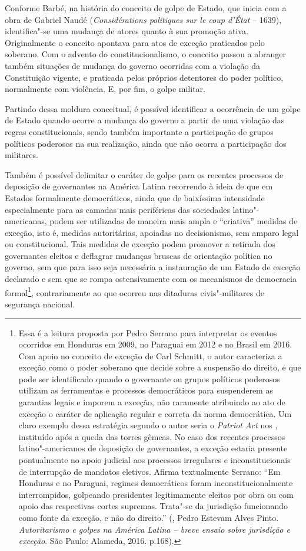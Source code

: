 Conforme Barbé, na história do conceito de golpe de Estado, que inicia
com a obra de Gabriel Naudé (\emph{Considérations politiques sur le coup
d'État} -- 1639), identifica"-se uma mudança de atores quanto à sua
promoção ativa. Originalmente o conceito apontava para atos de exceção
praticados pelo soberano. Com o advento do constitucionalismo, o
conceito passou a abranger também situações de mudança do governo
ocorridas com a violação da Constituição vigente, e praticada pelos
próprios detentores do poder político, normalmente com violência. E, por
fim, o golpe militar.

Partindo dessa moldura conceitual, é possível identificar a ocorrência
de um golpe de Estado quando ocorre a mudança do governo a partir de uma
violação das regras constitucionais, sendo também importante a
participação de grupos políticos poderosos na sua realização, ainda
que não ocorra a participação dos militares.

Também é possível delimitar o caráter de golpe para os recentes
processos de deposição de governantes na América Latina recorrendo à
ideia de que em Estados formalmente democráticos, ainda que de
baixíssima intensidade especialmente para as camadas mais periféricas
das sociedades latino"-americanas, podem ser utilizadas de maneira mais
ampla e ``criativa'' medidas de exceção, isto é, medidas autoritárias,
apoiadas no decisionismo, sem amparo legal ou constitucional. Tais
medidas de exceção podem promover a retirada dos governantes eleitos e
deflagrar mudanças bruscas de orientação política no governo, sem que
para isso seja necessária a instauração de um Estado de exceção
declarado e sem que se rompa ostensivamente com os mecanismos de
democracia formal\footnote{Essa é a leitura proposta por Pedro Serrano
  para interpretar os eventos ocorridos em Honduras em 2009, no Paraguai
  em 2012 e no Brasil em 2016. Com apoio no conceito de exceção de Carl
  Schmitt, o autor caracteriza a exceção como o poder soberano que decide
  sobre a suspensão do direito, e que pode ser identificado quando o
  governante ou grupos políticos poderosos utilizam as ferramentas e
  processos democráticos para suspenderem as garantias legais e imporem
  a exceção, não raramente atribuindo ao ato de exceção o caráter de
  aplicação regular e correta da norma democrática. Um claro exemplo
  dessa estratégia segundo o autor seria o \emph{Patriot Act} nos ,
  instituído após a queda das torres gêmeas. No caso dos recentes
  processos latino"-americanos de deposição de governantes, a exceção
  estaria presente pontualmente no apoio judicial aos processos
  irregulares e inconstitucionais de interrupção de mandatos eletivos.
  Afirma textualmente Serrano: ``Em Honduras e no Paraguai, regimes
      democráticos foram inconstitucionalmente interrompidos, golpeando
      presidentes legitimamente eleitos por obra ou com apoio das
      respectivas cortes supremas. Trata"-se da jurisdição funcionando como
      fonte da exceção, e não do direito.'' (, Pedro Estevam Alves
  Pinto. \emph{Autoritarismo e golpes na América Latina -- breve
  ensaio sobre jurisdição e exceção}. São Paulo: Alameda, 2016. p.168).},
contrariamente ao que ocorreu nas ditaduras civis"-militares de segurança
nacional.

